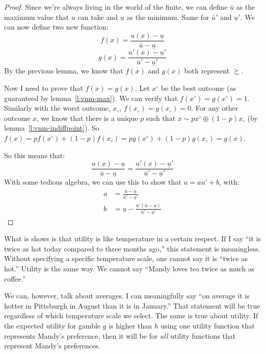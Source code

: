 \begin{proof}
Since we're always living in the world of the finite, we can define $\bar{u}$ as the maximum value that $u$ can take and $\underline{u}$ as the minimum.  Same for $\bar{u}'$ and $\underline{u}'$.   We can now define two new function:
\begin{equation*}
f(x) = \frac{u(x) - \underline{u}}{\bar{u} - \underline{u}}
\end{equation*}
\begin{equation*}
g(x) = \frac{u'(x) - \underline{u}'}{\bar{u}' - \underline{u}'}
\end{equation*}
By the previous lemma, we know that $f(x)$ and $g(x)$ both represent $\succsim$.

Now I need to prove that $f(x) = g(x)$. Let $x^\circ$ be the best outcome (as guaranteed by lemma~\ref{l:vnm-max}). We can verify that $f(x^\circ) = g(x^\circ) = 1$.  Similarly with the worst outcome, $x_\circ$, $f(x_\circ) = g(x_\circ) = 0$. For any other outcome $x$, we know that there is a unique $p$ such that $x \sim p x^\circ \oplus (1-p) x_\circ$ (by lemma~\ref{l:vnm-indiffpoint}).  So $f(x) = p f(x^\circ) + (1-p)f(x_\circ) = p g(x^\circ) + (1-p)g(x_\circ) = g(x)$.

So this means that:
\begin{equation*}
\frac{u(x) - \underline{u}}{\bar{u} - \underline{u}} =
\frac{u'(x) - \underline{u}'}{\bar{u}' - \underline{u}'}
\end{equation*}
With some tedious algebra, we can use this to show that $u = a u' + b$, with:
\begin{align*}
    a & = \frac{\bar{u} - \underline{u}}{\bar{u}' - \underline{u}'} \\
    b & = \underline{u} - \frac{\underline{u}'(\bar{u} - \underline{u})}{\bar{u}'-\underline{u}'}
\end{align*}
\end{proof}

What is shows is that utility is like temperature in a certain respect.  If I say ``it is twice as hot today compared to three months ago,'' this statement is meaningless.  Without specifying a specific temperature scale, one cannot say it is ``twice as hot.''  Utility is the same way.  We cannot say ``Mandy loves tea twice as much as coffee.''

We can, however, talk about averages.  I can meaningfully say ``on average it is hotter in Pittsburgh in August than it is in January.'' That statement will be true regardless of which temperature scale we select.  The same is true about utility.  If the expected utility for gamble $g$ is higher than $h$ using one utility function that represents Mandy's preference, then it will be for {\it all} utility functions that represent Mandy's preferences.

